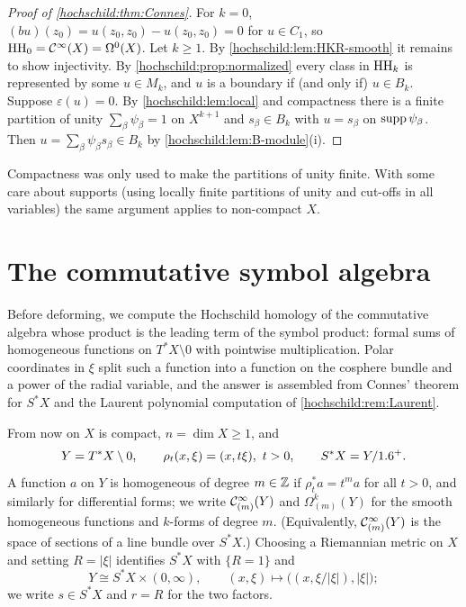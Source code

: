 \begin{proof}[Proof of \cref{hochschild:thm:Connes}]
For $k=0$, $(bu)(z_0)=u(z_0,z_0)-u(z_0,z_0)=0$ for $u\in C_1$, so
$\operatorname{HH}_0=\mathcal{C}^\infty(X)=\Omega^0(X)$. Let $k\ge1$. By
\cref{hochschild:lem:HKR-smooth} it remains to show injectivity. By
\cref{hochschild:prop:normalized} every class in $\operatorname{HH}_k$ is represented by
some $u\in M_k$, and $u$ is a boundary if (and only if) $u\in B_k$. Suppose
$\varepsilon(u)=0$. By \cref{hochschild:lem:local} and compactness there is a
finite partition of unity $\sum_\beta\psi_\beta=1$ on $X^{k+1}$ and
$s_\beta\in B_k$ with $u=s_\beta$ on $\operatorname{supp}\psi_\beta$. Then
$u=\sum_\beta\psi_\beta s_\beta\in B_k$ by \cref{hochschild:lem:B-module}(i).
\end{proof}

\begin{remark}\label{hochschild:rem:noncompact}
Compactness was only used to make the partitions of unity finite. With some
care about supports (using locally finite partitions of unity and cut-offs
in all variables) the same argument applies to non-compact $X$.
\end{remark}

\section{The commutative symbol algebra}\label{hochschild:sec:commutative}

Before deforming, we compute the Hochschild homology of the commutative
algebra whose product is the leading term of the symbol product: formal sums
of homogeneous functions on $T^*X\setminus0$ with pointwise multiplication.
Polar coordinates in $\xi$ split such a function into a function on the
cosphere bundle and a power of the radial variable, and the answer is
assembled from Connes' theorem for $S^*X$ and the Laurent polynomial
computation of \cref{hochschild:rem:Laurent}.

From now on $X$ is compact, $n=\dim X\ge1$, and
\begin{equation*}
  Y=T^*X\setminus0,\qquad \rho_t(x,\xi)=(x,t\xi),\ t>0,\qquad
  S^*X=Y/1.6^+ .
\end{equation*}
A function $a$ on $Y$ is homogeneous of degree $m\in\mathbb{Z}$ if $\rho_t^*a=t^ma$
for all $t>0$, and similarly for differential forms; we write
$\mathcal{C}^\infty_{(m)}(Y)$ and $\Omega^k_{(m)}(Y)$ for the smooth homogeneous functions
and $k$-forms of degree $m$. (Equivalently, $\mathcal{C}^\infty_{(m)}(Y)$ is the space of
sections of a line bundle over $S^*X$.) Choosing a Riemannian metric on $X$
and setting $R=|\xi|$ identifies $S^*X$ with $\{R=1\}$ and
\begin{equation}
  Y\cong S^*X\times(0,\infty),\qquad (x,\xi)\longmapsto\bigl((x,\xi/|\xi|),|\xi|\bigr);
  \label{hochschild:eq:polar}
\end{equation}
we write $s\in S^*X$ and $r=R$ for the two factors.

